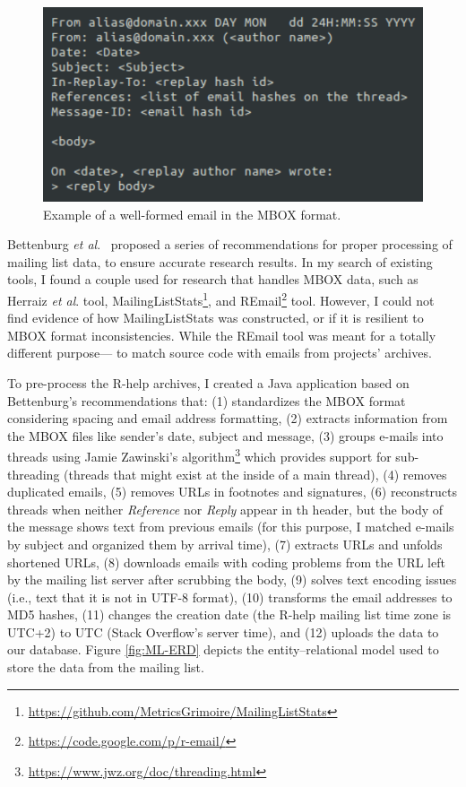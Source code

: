 \documentclass{sig-alternate-05-2015}
\begin{document}
	\begin{figure}[!htb]
		\centering
		\includegraphics[width=0.8\columnwidth]{Figures/WellFormedEmail}
		\caption[Example of a well-formed MBOX file]{Example of a well-formed email in the MBOX format.}
		\label{fig:WellFormedEmail}
	\end{figure}

	Bettenburg \textit{et al}.~\cite{Bettenburg2009} proposed a series of recommendations for proper processing of mailing list data, to ensure accurate research results.
	In my search of existing tools, I found a couple used for research that handles MBOX data, such as Herraiz \textit{et al}. tool, MailingListStats\footnote{\url{https://github.com/MetricsGrimoire/MailingListStats}}, and REmail\footnote{\url{https://code.google.com/p/r-email/}} tool.
	However, I could not find evidence of how MailingListStats was constructed, or if it is resilient to MBOX format inconsistencies. While the REmail tool was meant for a totally different purpose--- to match source code with emails from projects' archives.

	To pre-process the R-help archives, I created a Java application based on Bettenburg's recommendations that:
	(1) standardizes the MBOX format considering spacing and email address formatting,
	(2) extracts information from the MBOX files like sender's date, subject and message,
	(3) groups e-mails into threads using Jamie Zawinski's algorithm\footnote{\url{https://www.jwz.org/doc/threading.html}} which provides support for sub-threading (threads that might exist at the inside of a main thread),
	(4) removes duplicated emails,
	(5) removes URLs in footnotes and signatures,
	(6) reconstructs threads when neither \textit{Reference} nor \textit{Reply} appear in th header, but the body of the message shows text from previous emails (for this purpose, I matched e-mails by subject and organized them by arrival time),%
	(7) extracts URLs and unfolds shortened URLs,
	(8) downloads emails with coding problems from the URL left by the mailing list server after scrubbing the body,
	(9) solves text encoding issues (i.e., text that it is not in UTF-8 format),
	(10) transforms the email addresses to MD5 hashes,
	(11) changes the creation date (the R-help mailing list time zone is UTC+2) to UTC (Stack Overflow's server time),
	and (12) uploads the data to our database.
	Figure \ref{fig:ML-ERD} depicts the entity--relational model used to store the data from the mailing list.
\end{document}
